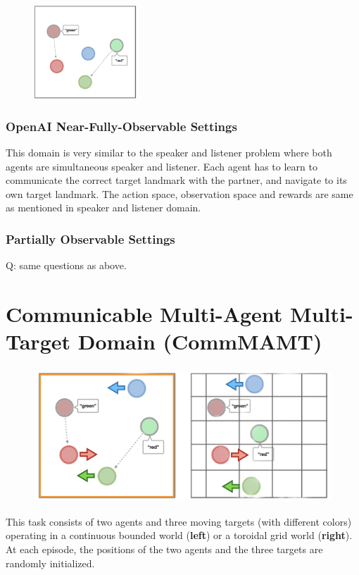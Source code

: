 \documentclass{article}
\begin{document}
\begin{figure}[h!]
    \centering
    \includegraphics[height=3.5cm]{ref.png}
\end{figure}

\subsubsection{OpenAI Near-Fully-Observable Settings}

This domain is very similar to the speaker and listener problem where both agents are simultaneous speaker and listener. Each agent has to learn to communicate the correct target landmark with the partner, and navigate to its own target landmark. The action space, observation space and rewards are same as mentioned in speaker and listener domain. 

\subsubsection{Partially Observable Settings}

{\color{red} Q: same questions as above.}

\newpage
\section{Communicable Multi-Agent Multi-Target Domain (CommMAMT)}

\begin{figure}[h!]
    \centering
    \includegraphics[height=5cm]{commMAMT.png}
\end{figure}

This task consists of two agents and three moving targets (with different colors) operating in a continuous bounded world (\textbf{left}) or a toroidal grid world (\textbf{right}). At each episode, the positions of the two agents and the three targets are randomly initialized. 
\end{document}

